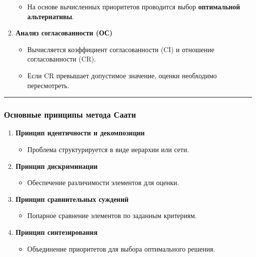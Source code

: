 \documentclass[
]{article}
\providecommand{\tightlist}{%
  \setlength{\itemsep}{0pt}\setlength{\parskip}{0pt}}
\begin{document}
\begin{enumerate}
  \begin{itemize}
  \tightlist
  \item
    На основе вычисленных приоритетов проводится выбор
    \textbf{оптимальной альтернативы}.
  \end{itemize}
\item
  \textbf{Анализ согласованности (ОС)}

  \begin{itemize}
  \tightlist
  \item
    Вычисляется коэффициент согласованности (CI) и отношение
    согласованности (CR).
  \item
    Если CR превышает допустимое значение, оценки необходимо
    пересмотреть.
  \end{itemize}
\end{enumerate}

\begin{center}\rule{0.5\linewidth}{0.5pt}\end{center}

\subsubsection{\texorpdfstring{\textbf{Основные принципы метода
Саати}}{Основные принципы метода Саати}}\label{ux43eux441ux43dux43eux432ux43dux44bux435-ux43fux440ux438ux43dux446ux438ux43fux44b-ux43cux435ux442ux43eux434ux430-ux441ux430ux430ux442ux438}

\begin{enumerate}
\def\labelenumi{\arabic{enumi}.}
\item
  \textbf{Принцип идентичности и декомпозиции}

  \begin{itemize}
  \tightlist
  \item
    Проблема структурируется в виде иерархии или сети.
  \end{itemize}
\item
  \textbf{Принцип дискриминации}

  \begin{itemize}
  \tightlist
  \item
    Обеспечение различимости элементов для оценки.
  \end{itemize}
\item
  \textbf{Принцип сравнительных суждений}

  \begin{itemize}
  \tightlist
  \item
    Попарное сравнение элементов по заданным критериям.
  \end{itemize}
\item
  \textbf{Принцип синтезирования}

  \begin{itemize}
  \tightlist
  \item
    Объединение приоритетов для выбора оптимального решения.
  \end{itemize}
\end{enumerate}
\end{document}
